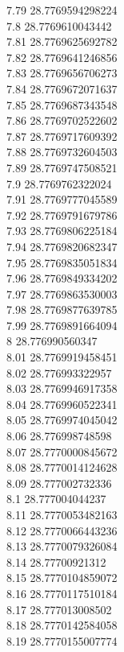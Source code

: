 {7.79	28.7769594298224\\
7.8	28.7769610043442\\
7.81	28.7769625692782\\
7.82	28.7769641246856\\
7.83	28.7769656706273\\
7.84	28.7769672071637\\
7.85	28.7769687343548\\
7.86	28.7769702522602\\
7.87	28.7769717609392\\
7.88	28.7769732604503\\
7.89	28.7769747508521\\
7.9	28.7769762322024\\
7.91	28.7769777045589\\
7.92	28.7769791679786\\
7.93	28.7769806225184\\
7.94	28.7769820682347\\
7.95	28.7769835051834\\
7.96	28.7769849334202\\
7.97	28.7769863530003\\
7.98	28.7769877639785\\
7.99	28.7769891664094\\
8	28.776990560347\\
8.01	28.7769919458451\\
8.02	28.776993322957\\
8.03	28.7769946917358\\
8.04	28.7769960522341\\
8.05	28.7769974045042\\
8.06	28.776998748598\\
8.07	28.7770000845672\\
8.08	28.7770014124628\\
8.09	28.777002732336\\
8.1	28.777004044237\\
8.11	28.7770053482163\\
8.12	28.7770066443236\\
8.13	28.7770079326084\\
8.14	28.77700921312\\
8.15	28.7770104859072\\
8.16	28.7770117510184\\
8.17	28.777013008502\\
8.18	28.7770142584058\\
8.19	28.7770155007774\\
}
